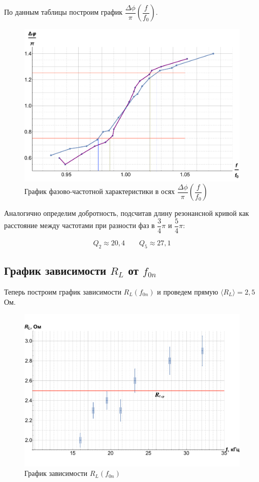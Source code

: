 \documentclass[12pt]{kiarticle} %
\begin{document}
По данным таблицы построим график $ \dfrac{\Delta\phi}{\pi}  \left( \dfrac{f}{f_0} \right) $.

\begin{figure}[h!]
	\includegraphics[scale=0.5]{Fii.pdf}
	\caption{График фазово-частотной характеристики в осях $ \dfrac{\Delta\phi}{\pi}  \left( \dfrac{f}{f_0} \right) $}
\end{figure}

Аналогично определим добротность, подсчитав длину резонансной кривой как  расстояние между частотами при разности фаз в $ \dfrac{3}{4}\pi $ и $ \dfrac{5}{4}\pi $:

\begin{equation}\label{}
Q_2 \approx 20,4 \qquad Q_5 \approx 27,1 
\end{equation}

\subsection{График  зависимости $ R_L $ от $ f_{0n} $} 

Теперь построим график зависимости $ R_L (f_{0n}) $ и проведем прямую $ \langle R_L \rangle = 2,5 $ Ом. 

\begin{figure}[h!]
	\includegraphics[scale=0.5]{RR.pdf}
	\caption{График зависимости $ R_L (f_{0n}) $}
\end{figure}
 
\end{document}
